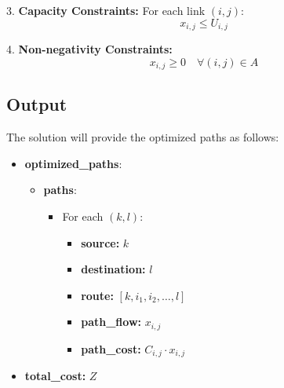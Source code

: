 \documentclass{article}
\begin{document}
3. \textbf{Capacity Constraints:} For each link \( (i,j) \):
   \[
   x_{i,j} \leq U_{i,j}
   \]

4. \textbf{Non-negativity Constraints:}
   \[
   x_{i,j} \geq 0 \quad \forall (i,j) \in A
   \]

\subsection*{Output}
The solution will provide the optimized paths as follows:
\begin{itemize}
    \item {\bf optimized\_paths}:
    \begin{itemize}
        \item {\bf paths}:
        \begin{itemize}
            \item For each \( (k,l) \):
            \begin{itemize}
                \item {\bf source:} \( k \)
                \item {\bf destination:} \( l \)
                \item {\bf route:} \( [k, i_1, i_2, \ldots, l] \)
                \item {\bf path\_flow:} \( x_{i,j} \)
                \item {\bf path\_cost:} \( C_{i,j} \cdot x_{i,j} \)
            \end{itemize}
        \end{itemize}
    \end{itemize}
    \item {\bf total\_cost:} \( Z \)
\end{itemize}
\end{document}
